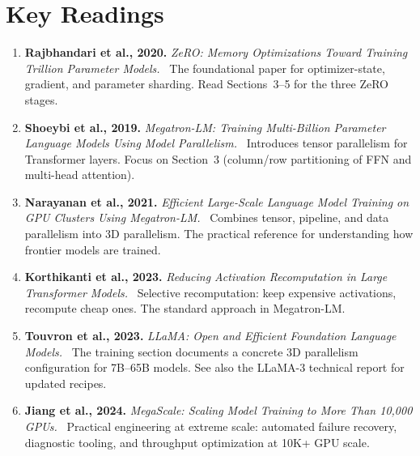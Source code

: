 \section*{Key Readings}

\begin{enumerate}[nosep]
  \item \textbf{Rajbhandari et al., 2020.} \textit{ZeRO: Memory Optimizations Toward Training Trillion Parameter Models.}~\cite{rajbhandari2020zero} The foundational paper for optimizer-state, gradient, and parameter sharding. Read Sections~3--5 for the three ZeRO stages.
  \item \textbf{Shoeybi et al., 2019.} \textit{Megatron-LM: Training Multi-Billion Parameter Language Models Using Model Parallelism.}~\cite{shoeybi2019megatron} Introduces tensor parallelism for Transformer layers. Focus on Section~3 (column/row partitioning of FFN and multi-head attention).
  \item \textbf{Narayanan et al., 2021.} \textit{Efficient Large-Scale Language Model Training on GPU Clusters Using Megatron-LM.}~\cite{narayanan2021efficient} Combines tensor, pipeline, and data parallelism into 3D parallelism. The practical reference for understanding how frontier models are trained.
  \item \textbf{Korthikanti et al., 2023.} \textit{Reducing Activation Recomputation in Large Transformer Models.}~\cite{korthikanti2023reducing} Selective recomputation: keep expensive activations, recompute cheap ones. The standard approach in Megatron-LM.
  \item \textbf{Touvron et al., 2023.} \textit{LLaMA: Open and Efficient Foundation Language Models.}~\cite{touvron2023llama} The training section documents a concrete 3D parallelism configuration for 7B--65B models. See also the LLaMA-3 technical report for updated recipes.
  \item \textbf{Jiang et al., 2024.} \textit{MegaScale: Scaling Model Training to More Than 10,000 GPUs.}~\cite{jiang2024megascale} Practical engineering at extreme scale: automated failure recovery, diagnostic tooling, and throughput optimization at 10K+ GPU scale.
\end{enumerate}
